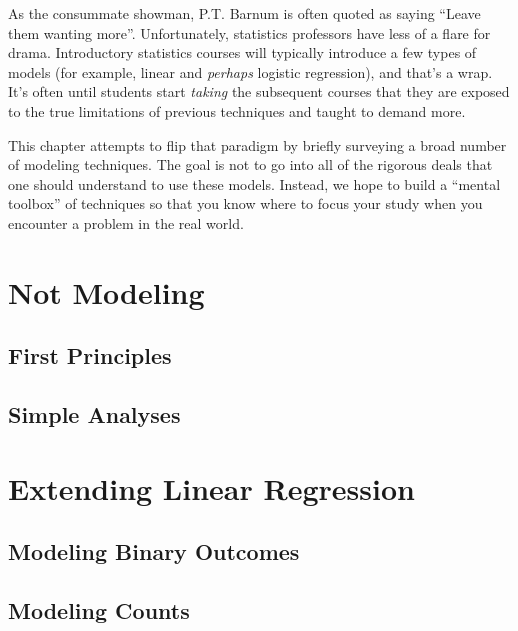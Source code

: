 \documentclass[
]{krantz}
\begin{document}
As the consummate showman, P.T. Barnum is often quoted as saying ``Leave them wanting more''. Unfortunately, statistics professors have less of a flare for drama. Introductory statistics courses will typically introduce a few types of models (for example, linear and \emph{perhaps} logistic regression), and that's a wrap. It's often until students start \emph{taking} the subsequent courses that they are exposed to the true limitations of previous techniques and taught to demand more.

This chapter attempts to flip that paradigm by briefly surveying a broad number of modeling techniques. The goal is not to go into all of the rigorous deals that one should understand to use these models. Instead, we hope to build a ``mental toolbox'' of techniques so that you know where to focus your study when you encounter a problem in the real world.

\hypertarget{not-modeling}{%
\section{Not Modeling}\label{not-modeling}}

\hypertarget{first-principles}{%
\subsection{First Principles}\label{first-principles}}

\hypertarget{simple-analyses}{%
\subsection{Simple Analyses}\label{simple-analyses}}

\hypertarget{extending-linear-regression}{%
\section{Extending Linear Regression}\label{extending-linear-regression}}

\hypertarget{modeling-binary-outcomes}{%
\subsection{Modeling Binary Outcomes}\label{modeling-binary-outcomes}}

\hypertarget{modeling-counts}{%
\subsection{Modeling Counts}\label{modeling-counts}}
\end{document}
